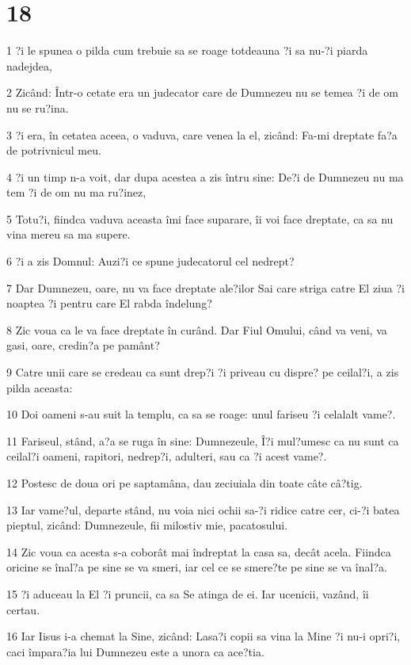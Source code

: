 \chapter{18}

\par 1 ?i le spunea o pilda cum trebuie sa se roage totdeauna ?i sa nu-?i piarda nadejdea,
\par 2 Zicând: Într-o cetate era un judecator care de Dumnezeu nu se temea ?i de om nu se ru?ina.
\par 3 ?i era, în cetatea aceea, o vaduva, care venea la el, zicând: Fa-mi dreptate fa?a de potrivnicul meu.
\par 4 ?i un timp n-a voit, dar dupa acestea a zis întru sine: De?i de Dumnezeu nu ma tem ?i de om nu ma ru?inez,
\par 5 Totu?i, fiindca vaduva aceasta îmi face suparare, îi voi face dreptate, ca sa nu vina mereu sa ma supere.
\par 6 ?i a zis Domnul: Auzi?i ce spune judecatorul cel nedrept?
\par 7 Dar Dumnezeu, oare, nu va face dreptate ale?ilor Sai care striga catre El ziua ?i noaptea ?i pentru care El rabda îndelung?
\par 8 Zic voua ca le va face dreptate în curând. Dar Fiul Omului, când va veni, va gasi, oare, credin?a pe pamânt?
\par 9 Catre unii care se credeau ca sunt drep?i ?i priveau cu dispre? pe ceilal?i, a zis pilda aceasta:
\par 10 Doi oameni s-au suit la templu, ca sa se roage: unul fariseu ?i celalalt vame?.
\par 11 Fariseul, stând, a?a se ruga în sine: Dumnezeule, Î?i mul?umesc ca nu sunt ca ceilal?i oameni, rapitori, nedrep?i, adulteri, sau ca ?i acest vame?.
\par 12 Postesc de doua ori pe saptamâna, dau zeciuiala din toate câte câ?tig.
\par 13 Iar vame?ul, departe stând, nu voia nici ochii sa-?i ridice catre cer, ci-?i batea pieptul, zicând: Dumnezeule, fii milostiv mie, pacatosului.
\par 14 Zic voua ca acesta s-a coborât mai îndreptat la casa sa, decât acela. Fiindca oricine se înal?a pe sine se va smeri, iar cel ce se smere?te pe sine se va înal?a.
\par 15 ?i aduceau la El ?i pruncii, ca sa Se atinga de ei. Iar ucenicii, vazând, îi certau.
\par 16 Iar Iisus i-a chemat la Sine, zicând: Lasa?i copii sa vina la Mine ?i nu-i opri?i, caci împara?ia lui Dumnezeu este a unora ca ace?tia.
